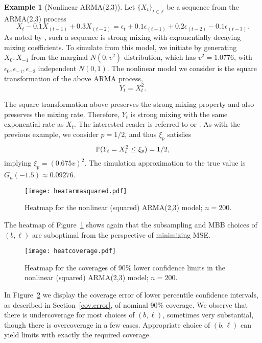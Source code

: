 \documentclass[a4paper, 12pt]{article}
\theoremstyle{plain}
\theoremstyle{definition}
\newcommand{\prob}{{\Bbb P}}
\newtheorem{example}{Example}
\begin{document}
\begin{example}[Nonlinear ARMA(2,3)]
Let $\{X_{t}\}_{t \in \mathbb{Z}}$ be a sequence from the ARMA(2,3) process
\[
X_{t}-0.1X_{(t-1)}+0.3X_{(t-2)}=\epsilon_{t}+0.1\epsilon_{(t-1)}+0.2\epsilon_{(t-2)}-0.1\epsilon_{(t-3)}.
\]
As noted by \citet[Example 6.1]{Lahiri:2003}, such a sequence is strong mixing with exponentially decaying mixing coefficients. To simulate from this model, we initiate by generating $X_{0}, X_{-1}$ from the marginal $N(0, v^{2})$ distribution, which has $v^{2}=1.0776$, with $\epsilon_{0}, \epsilon_{-1}, \epsilon_{-2}$ independent $N(0,1)$. The nonlinear model we consider is the square transformation of the above ARMA process,
\[
Y_{t}=X_{t}^{2}.
\]
\end{example}
The square transformation above preserves the strong mixing property and also preserves the mixing rate. Therefore, $Y_{t}$ is strong mixing with the same exponential rate as $X_{t}$. The interested reader is referred to \citet[p. 69]{FanYao:2003} or \citet[p. 258]{DavisMikosch:2009}. As with the previous example, we consider $p=1/2$, and thus $\xi_{p}$ satisfies
\[
\prob(Y_{t}=X_{t}^{2} \leq \xi_{p})=1/2 ,
\]
implying $\xi_{p}=(0.675v)^{2}$. The simulation approximation to the true value is $G_{n}(-1.5) \approx 0.09276$.

\begin{figure}[h]
\centering
\caption{\label{ARMAsquaredheat}
Heatmap for the nonlinear (squared) ARMA(2,3) model; $n=200$.}
\texttt{[image: heatarmasquared.pdf]}
\end{figure}
The heatmap of Figure~\ref{ARMAsquaredheat} shows again that the subsampling and MBB choices of $(b,\ell)$ are suboptimal from the perspective of minimizing MSE.

\begin{figure}[h]
\centering
\caption{\label{ARMAsquaredheat-lowercoverage}
Heatmap for the coverages of 90\% lower confidence limits in the nonlinear (squared) ARMA(2,3) model; $n=200$.}
\texttt{[image: heatcoverage.pdf]}
\end{figure}
In Figure~\ref{ARMAsquaredheat-lowercoverage} we display the coverage error of lower percentile confidence intervals, as described in Section~\ref{cov.error}, of nominal 90\% coverage. We observe that there is undercoverage for most choices of $(b,\ell)$, sometimes very substantial, though there is overcoverage in a few cases. Appropriate choice of $(b, \ell)$ can yield limits with exactly the required coverage.
\end{document}
